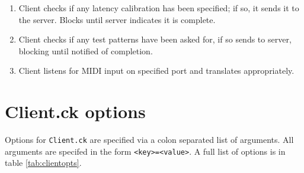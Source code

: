\documentclass[11pt]{article}
\begin{document}
\begin{flushleft}
\begin{enumerate}[\bf1.]
\begin{enumerate} [\bf a.]
			to the console.
		\item Client checks if any latency calibration has been specified; if so, it sends it to the server. Blocks until server indicates it is complete.
		\item Client checks if any test patterns have been asked for, if so sends to server, blocking until notified of completion.
		\item Client listens for MIDI input on specified port and translates appropriately.
	 \end{enumerate}
\end{enumerate}
\end{flushleft}

\newpage
\section{Client.ck options}
\label{sec:clientopts}
Options for \texttt{Client.ck} are specified via a colon separated list of arguments. All arguments are specifed in the form \texttt{<key>=<value>}. A full list of options
is in table \ref{tab:clientopts}.
\end{document}
